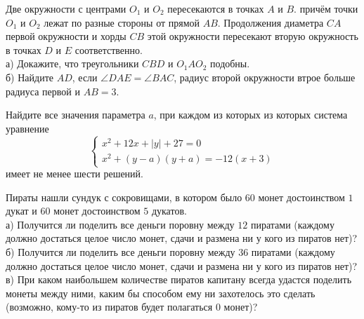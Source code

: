 \begin{training}[1]
\begin{listofex}[resume]
		\item Две окружности с центрами \( O_1 \) и \( O_2 \) пересекаются в точках \( A \) и \( B \). причём точки \( O_1 \) и \( O_2 \) лежат по разные стороны от прямой \( AB \). Продолжения диаметра \( CA \) первой окружности и хорды \( CB \) этой окружности пересекают вторую окружность в точках \( D \) и \( E \) соответственно. \\
		а) Докажите, что треугольники \( CBD \) и \( O_1AO_2 \) подобны.\\
		б) Найдите \( AD \), если \( \angle DAE=\angle BAC \), радиус второй окружности втрое больше радиуса первой и \( AB=3 \).
		\item Найдите все значения параметра \( a \), при каждом из которых из которых система уравнение
		\[\begin{cases} x^2+12x+|y|+27=0 \\ x^2+(y-a)(y+a)=-12(x+3) \end{cases}\]
		имеет не менее шести решений.
		\item Пираты нашли сундук с сокровищами, в котором было \( 60 \) монет достоинством \( 1 \) дукат и \( 60  \) монет достоинством \( 5 \) дукатов.\\
		а) Получится ли поделить все деньги поровну между \( 12 \) пиратами (каждому должно достаться целое число монет, сдачи и размена ни у кого из пиратов нет)?\\
		б) Получится ли поделить все деньги поровну между \( 36 \) пиратами (каждому должно достаться целое число монет, сдачи и размена ни у кого из пиратов нет)?\\
		в) При каком наибольшем количестве пиратов капитану всегда удастся поделить монеты между ними, каким бы способом ему ни захотелось это сделать (возможно, кому-то из пиратов будет полагаться 0 монет)?
	\end{listofex}
\end{training}

